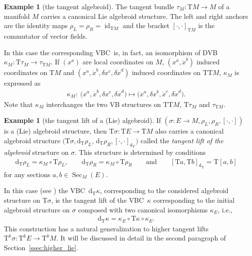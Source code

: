 \documentclass[pdftex]{sigma}
\newcommand{\ZM}{{VBC}} %
\newcommand{\Sec}{\operatorname{Sec}}
\newcommand{\id}{\operatorname{id}}
\newcommand{\dd}{\mathrm{d}}
\newcommand{\ra}{\rightarrow}
\newcommand{\rhoL}{\rho_L} %
\newcommand{\rhoR}{\rho_R}
\newcommand{\T}{\mathrm{T}} %
\newcommand{\TT}[1]{\mathrm{T}^{#1}} %
\numberwithin{equation}{section}
\theoremstyle{definition}
\newtheorem{ex}[thm]{Example}
\begin{document}
\begin{ex}[the tangent algebroid] \label{ex:tang_alg}The tangent bundle $\tau_M\colon \T M \ra M$ of a manifold $M$ carries a canonical Lie algebroid structure. The left and right anchors are the identity maps $\rhoL=\rhoR=\id_{\T M}$ and the bracket $[\cdot,\cdot]_{\T M}$ is the commutator of vector fields.

In this case the corresponding \ZM\ is, in fact, an isomorphism of DVB $\kappa_M\colon \T\tau_M\ra \tau_{\T M}$. If $(x^a)$ are local coordinates on $M$, $(x^a, \dot x^b)$ induced coordinates on $\T M$ and $(x^a, \dot x^b, \delta x^c,\delta\dot x^d)$ induced coordinates on $\T\T M$, $\kappa_M$ is expressed as
\begin{gather*} \kappa_M\colon \ \big(x^a, \dot x^b, \delta x^c,\delta\dot x^d\big)\longmapsto \big(x^a, \delta x^b, \dot x^c,\delta\dot x^d\big).\end{gather*}
Note that $\kappa_M$ interchanges the two VB structures on $\T \T M$, $\T\tau_M$ and $\tau_{\T M}$.
\end{ex}

\begin{ex}[the tangent lift of a (Lie) algebroid]\label{ex:tang_lift} If $(\sigma\colon E\ra M, \rhoL,\rhoR,[\cdot,\cdot])$ is a (Lie) algebroid structure, then $\T\sigma\colon \T E\ra \T M$ also carries a canonical algebroid structure $(\T\sigma, \dd_\T\rhoL$, $\dd_\T\rhoR, [\cdot,\cdot]_{\dd_\T})$ called the \emph{tangent lift of the algebroid} structure on $\sigma$. This structure is determined by conditions{\samepage
\begin{gather*} \dd_\T\rhoL=\kappa_M\circ \T\rhoL,\qquad \dd_\T\rhoR=\kappa_M\circ \T\rhoR\qquad\text{and}\qquad [\T a,\T b]_{\dd_\T}=\T[a,b] \end{gather*}
for any sections $a,b\in\Sec_M(E)$.}

In this case (see \cite{JG_PU_Algebroids_1999}) the \ZM\ $\dd_\T\kappa$, corresponding to the considered algebroid structure on $\T\sigma$, is the tangent lift of the \ZM\ $\kappa$ corresponding to the initial algebroid structure on $\sigma$ composed with two canonical isomorphisms $\kappa_E$, i.e.,
\begin{gather*}\dd_\T\kappa=\kappa_E\circ\T \kappa \circ\kappa_E.\end{gather*}
 This construction has a natural generalization to higher tangent lifts $\TT{k}\sigma\colon \TT{k} E\ra\TT{k} M$. It will be discussed in detail in the second paragraph of Section~\ref{ssec:higher_lie}.
\end{ex}
\end{document}
